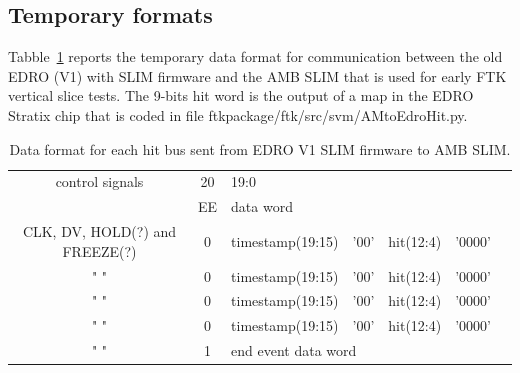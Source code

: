 \documentclass[10pt]{article}
\numberwithin{figure}{section}
\numberwithin{equation}{section}
\numberwithin{table}{section}
\newcommand{\0}{\phantom{0}}
\begin{document}
\subsection{Temporary formats}

Tabble~\ref{tab:oldEDRO_AM_hits} reports the temporary data format for communication between the old EDRO (V1) with SLIM firmware and the AMB SLIM that is used for early FTK vertical slice tests. The 9-bits hit word is the output of a map in the EDRO Stratix chip that is coded in file ftkpackage/ftk/src/svm/AMtoEdroHit.py.

\begin{table}[h]
\begin{tabular}{c|c|c|c|c|c|l}
control signals & 20 &  \multicolumn{4}{l}{19:0}    \\
 & EE & \multicolumn{4}{l}{data word}    \\ \hline \hline
{\tiny CLK, DV, HOLD(?) and FREEZE(?)}   & 0 &  timestamp(19:15) & '00' & hit(12:4) & '0000' \\ \hline
 "   "  & 0 &  timestamp(19:15) & '00' & hit(12:4) & '0000' \\ \hline
 "   "  & 0 &  timestamp(19:15) & '00' & hit(12:4) & '0000' \\ \hline
 "   "  & 0 &  timestamp(19:15) & '00' & hit(12:4) & '0000' \\ \hline
 "   "  & 1 & \multicolumn{4}{l}{end event data word}  \\
\end{tabular}
\caption{\label{tab:oldEDRO_AM_hits}Data format for each hit bus sent from EDRO V1 SLIM firmware to AMB SLIM.}
\end{table}







%

%
%
\end{document}
